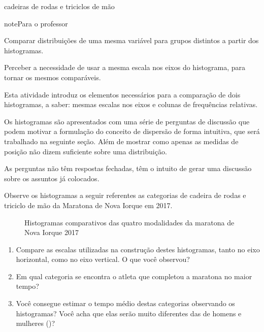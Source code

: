 \begin{task}{cadeiras de rodas e triciclos de mão}
\begin{sphinxadmonition}{note}{Para o professor}


Comparar distribuições de uma mesma variável para grupos distintos a partir dos histogramas.

Perceber a necessidade de usar a mesma escala nos eixos do histograma, para tornar os mesmos comparáveis.


Esta atividade introduz os elementos necessários para a comparação de dois histogramas, a saber: mesmas escalas nos eixos e colunas de frequências relativas.

Os histogramas são apresentados com uma série de perguntas de discussão que podem motivar a formulação do conceito de dispersão de forma intuitiva, que será trabalhado na seguinte seção. Além de mostrar como apenas as medidas de posição não dizem suficiente sobre uma distribuição.

As perguntas não têm respostas fechadas, têm o intuito de gerar uma discussão sobre os assuntos já colocados.
\end{sphinxadmonition}

Observe os histogramas a seguir referentes as categorias de cadeira de rodas e triciclo de mão da Maratona de Nova Iorque em 2017.

\begin{figure}[H]
\centering
\capstart

\noindent{}
\caption{Histogramas comparativos das quatro modalidades da maratona de Nova Iorque 2017}\label{\detokenize{PE104-2:id1}}\label{\detokenize{PE104-2:id7}}\end{figure}
\begin{enumerate}
\item {} 
Compare as escalas utilizadas na construção destes histogramas, tanto no eixo horizontal, como no eixo vertical. O que você observou?

\item {} 
Em qual categoria se encontra o atleta que completou a maratona no maior tempo?

\item {} 
Você consegue estimar o tempo médio destas categorias observando os histogramas? Você acha que elas serão muito diferentes das de homens e mulheres ()?


\end{enumerate}
\end{task}

